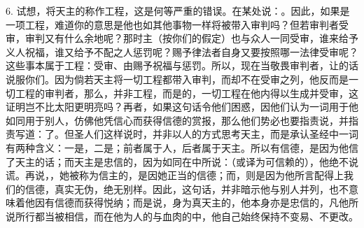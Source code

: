 6. 试想，将天主的称作工程，这是何等严重的错误。在某处说：。因此，如果是一项工程，难道你的意思是他也如其他事物一样将被带入审判吗？但若审判者受审，审判又有什么余地呢？那时主（按你们的假定）也与众人一同受审，谁来给予义人祝福，谁又给予不配之人惩罚呢？赐予律法者自身又要按照哪一法律受审呢？这些事本属于工程：受审、由赐予祝福与惩罚。所以，现在当敬畏审判者，让的话说服你们。因为倘若天主将一切工程都带入审判，而却不在受审之列，他反而是一切工程的审判者，那么，并非工程，而是的，一切工程在他内得以生成并受审，这证明岂不比太阳更明亮吗？再者，如果这句话令他们困惑，因他们认为一词用于他如同用于别人，仿佛他凭信心而获得信德的赏报，那么他们势必也要指责说，并指责写道：了。但圣人们这样说时，并非以人的方式思考天主，而是承认圣经中一词有两种含义：一是，二是；前者属于人，后者属于天主。所以有信德，是因为他信了天主的话；而天主是忠信的，因为如同在中所说：（或译为可信赖的），他绝不说谎。再说，，她被称为信主的，是因她正当的信德；而，则是因为他所言配得上我们的信德，真实无伪，绝无别样。因此，这句话，并非暗示他与别人并列，也不意味着他因有信德而获得悦纳；而是说，身为真天主的，他本身亦是忠信的，凡他所说所行都当被相信，而在他为人的与血肉的中，他自己始终保持不变易、不更改。\par

